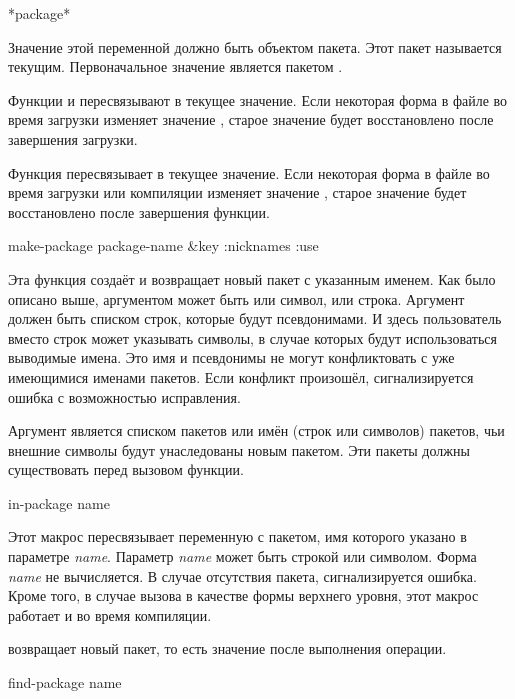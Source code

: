 \begin{defun}[Переменная]
*package*

Значение этой переменной должно быть объектом пакета. Этот пакет называется
текущим. Первоначальное значение  является пакетом .

Функции  и  пересвязывают  в текущее значение. Если
некоторая форма в файле во время загрузки изменяет значение ,
старое значение будет восстановлено после завершения загрузки.

Функция  пересвязывает  в текущее
значение. Если некоторая форма в файле во время загрузки или компиляции изменяет
значение , старое значение будет восстановлено после завершения функции.


\begin{defun}[Функция]
make-package package-name &key :nicknames :use

Эта функция создаёт и возвращает новый пакет с указанным именем. Как было
описано выше, аргументом может быть или символ, или строка. Аргумент
 должен быть списком строк, которые будут псевдонимами. И здесь
пользователь вместо строк может указывать символы, в случае которых будут
использоваться выводимые имена. Это имя и псевдонимы не могут конфликтовать с
уже имеющимися именами пакетов. Если конфликт произошёл, сигнализируется ошибка
с возможностью исправления.

Аргумент  является списком пакетов или имён (строк или символов)
пакетов, чьи внешние символы будут унаследованы новым пакетом. Эти пакеты должны
существовать перед вызовом функции. 
\end{defun}

\begin{defmac}
in-package name

Этот макрос пересвязывает переменную  с пакетом, имя которого
указано в параметре \emph{name}. Параметр \emph{name} может быть строкой или
символом. Форма \emph{name} не вычисляется.
В случае отсутствия пакета, сигнализируется ошибка.
Кроме того, в случае вызова в качестве формы верхнего уровня, этот макрос
работает и во время компиляции.

 возвращает новый пакет, то есть значение  после
выполнения операции.
\end{defmac}

\begin{defun}[Функция]
find-package name


\end{defun}
\end{defun}
